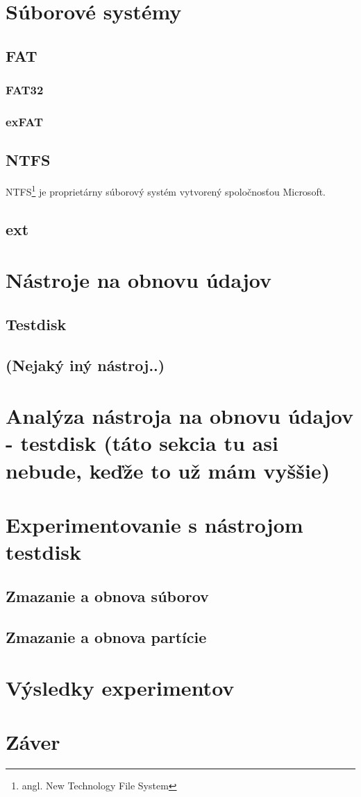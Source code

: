 \documentclass[12pt,oneside,slovak,a4paper]{article}
\begin{document}

\section{Súborové systémy}
\subsection{FAT}
\subsubsection{FAT32}
\subsubsection{exFAT}
\subsection{NTFS}
NTFS\footnote[1]{angl. New Technology File System} je proprietárny súborový systém vytvorený spoločnosťou Microsoft.
\subsection{ext}

\section{Nástroje na obnovu údajov}
\subsection{Testdisk}
\subsection{(Nejaký iný nástroj..)}

\section{Analýza nástroja na obnovu údajov - testdisk (táto sekcia tu asi nebude, keďže to už mám vyššie)}

\section{Experimentovanie s nástrojom testdisk}
\subsection{Zmazanie a obnova súborov}
\subsection{Zmazanie a obnova partície}

\section{Výsledky experimentov}

\section{Záver}




\end{document}
